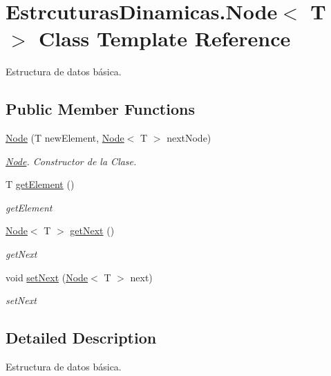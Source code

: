 \hypertarget{class_estrcuturas_dinamicas_1_1_node}{}\section{Estrcuturas\+Dinamicas.\+Node$<$ T $>$ Class Template Reference}
\label{class_estrcuturas_dinamicas_1_1_node}


Estructura de datos básica.  


\subsection*{Public Member Functions}
\begin{DoxyCompactItemize}
\item 
\mbox{\hyperlink{class_estrcuturas_dinamicas_1_1_node_aadac6302fd412298209a5e066beb127f}{Node}} (T new\+Element, \mbox{\hyperlink{class_estrcuturas_dinamicas_1_1_node}{Node}}$<$ T $>$ next\+Node)
\begin{DoxyCompactList}\small\item\em \mbox{\hyperlink{class_estrcuturas_dinamicas_1_1_node}{Node}}. Constructor de la Clase. \end{DoxyCompactList}\item 
T \mbox{\hyperlink{class_estrcuturas_dinamicas_1_1_node_a98a8fbb4ded20ee02d91d2982c094dc2}{get\+Element}} ()
\begin{DoxyCompactList}\small\item\em get\+Element \end{DoxyCompactList}\item 
\mbox{\hyperlink{class_estrcuturas_dinamicas_1_1_node}{Node}}$<$ T $>$ \mbox{\hyperlink{class_estrcuturas_dinamicas_1_1_node_a93966d358beb06f39a4b6648fda1d04c}{get\+Next}} ()
\begin{DoxyCompactList}\small\item\em get\+Next \end{DoxyCompactList}\item 
void \mbox{\hyperlink{class_estrcuturas_dinamicas_1_1_node_a4b40879d12a8659a42648db55b9fae34}{set\+Next}} (\mbox{\hyperlink{class_estrcuturas_dinamicas_1_1_node}{Node}}$<$ T $>$ next)
\begin{DoxyCompactList}\small\item\em set\+Next \end{DoxyCompactList}\end{DoxyCompactItemize}


\subsection{Detailed Description}
Estructura de datos básica. 


